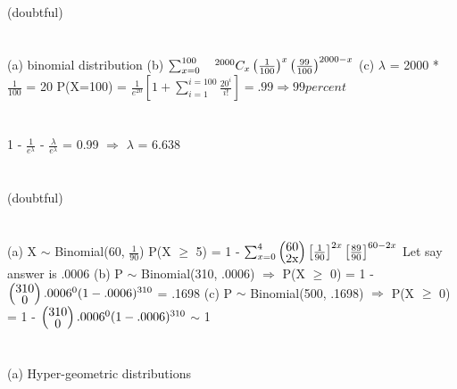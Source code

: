 \documentclass{report}
\begin{document}
\section{}
(doubtful)

\section{}
(a) binomial distribution
\newline
(b) $\sum_{x=0}^{100} \quad \textsuperscript{2000}C_x\left(\frac{1}{100}\right)^x\left(\frac{99}{100}\right)^{2000-x}$
\newline
(c) $\lambda$ = 2000 * $\frac{1}{100}$ = 20
\newline
P(X=100) = $\frac{1}{e^{20}}\left[1 + \sum_{i=1}^{i=100}\frac{20^{i}}{i!}\right] = .99 \Rightarrow 99 percent$
\newline

\section{}
1 - $\frac{1}{e^\lambda}$ - $\frac{\lambda}{e^\lambda}$ = 0.99 $\Rightarrow$
$\lambda$ = 6.638
\newline

\section{}
(doubtful)

\section{}
(a) X {$\sim$} Binomial(60, $\frac{1}{90}$)
{\newline}
P(X $\ge$ 5) = 1 - $\sum_{x = 0}^{4} \left(\stackanchor{60}{2x}\right)\left[\frac{1}{90}\right]^{2x}\left[\frac{89}{90}\right]^{60 - 2x}$ Let say answer is .0006
\newline
(b) P $\sim$ Binomial(310, .0006) $\Rightarrow$ P(X $\ge$ 0) = 1 - $\left(\stackanchor{310}{0}\right) .0006^0 (1 - .0006)^{310}$ = .1698
\newline
(c) P $\sim$ Binomial(500, .1698) $\Rightarrow$ P(X $\ge$ 0) = 1 - $\left(\stackanchor{310}{0}\right) .0006^0 (1 - .0006)^{310}$ {$\sim$} 1
\newline

\section{}
(a) Hyper-geometric distributions
\end{document}
